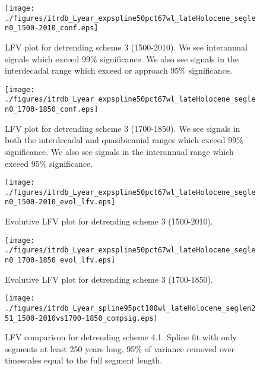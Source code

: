 \documentclass[phd,tocprelim]{cornell}
\begin{document}
\begin{figure}[!tbp]
\centering
\begin{minipage}[b]{0.45\textwidth}
\texttt{[image: ./figures/itrdb\_Lyear\_expspline50pct67wl\_lateHolocene\_seglen0\_1500-2010\_conf.eps]}
\caption{LFV plot for detrending scheme 3 (1500-2010). We see interannual signals which exceed 99\% significance. We also see signals in the interdecadal range which exceed or approach 95\% significance.}
\label{conf3:1500}
\end{minipage}
\hfill
\begin{minipage}[b]{0.45\textwidth}
\texttt{[image: ./figures/itrdb\_Lyear\_expspline50pct67wl\_lateHolocene\_seglen0\_1700-1850\_conf.eps]}
\caption{LFV plot for detrending scheme 3 (1700-1850). We see signals in both the interdecadal and quasibiennial ranges which exceed 99\% significance. We also see signals in the interannual range which exceed 95\% significance.}
\label{conf3:1700}
\end{minipage}
\end{figure}

\begin{figure}[!tbp]
\centering
\begin{minipage}[b]{0.45\textwidth}
\texttt{[image: ./figures/itrdb\_Lyear\_expspline50pct67wl\_lateHolocene\_seglen0\_1500-2010\_evol\_lfv.eps]}

\caption{Evolutive LFV plot for detrending scheme 3 (1500-2010).}
\label{evol3:1500}

\end{minipage}
\hfill
\begin{minipage}[b]{0.45\textwidth}
\texttt{[image: ./figures/itrdb\_Lyear\_expspline50pct67wl\_lateHolocene\_seglen0\_1700-1850\_evol\_lfv.eps]}
\caption{Evolutive LFV plot for detrending scheme 3 (1700-1850).}
\label{evol3:1700}
\end{minipage}
\end{figure}


\begin{figure}[!tbp]
\centering
\texttt{[image: ./figures/itrdb\_Lyear\_spline95pct100wl\_lateHolocene\_seglen251\_1500-2010vs1700-1850\_compsig.eps]}

\noindent{}

\caption{LFV comparison for detrending scheme 4.1. Spline fit with only segments at least 250 years long, 95\% of variance removed over timescales equal to the full segment length.}

\label{compsig4.1}
\end{figure}
\end{document}
